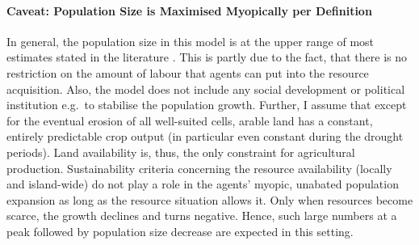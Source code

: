 \paragraph{Caveat: Population Size is Maximised Myopically per Definition}
In general, the population size in this model is at the upper range of most estimates stated in the literature \citep{Bahn2017}.
This is partly due to the fact, that there is no restriction on the amount of labour that agents can put into the resource acquisition. 
Also, the model does not include any social development or political institution e.g.\ to stabilise the population growth.
Further, I assume that except for the eventual erosion of all well-suited cells, arable land has a constant, entirely predictable crop output (in particular even constant during the drought periods). 
Land availability is, thus, the only constraint for agricultural production. 
Sustainability criteria concerning the resource availability (locally and island-wide) do not play a role in the agents' myopic, unabated population expansion as long as the resource situation allows it.
Only when resources become scarce, the growth declines and turns negative.
Hence, such large numbers at a peak followed by population size decrease are expected in this setting.


